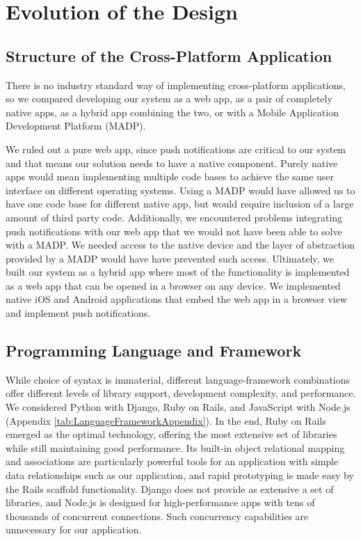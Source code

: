 \documentclass[12pt,letterpaper,titlepage]{article}
\begin{document}
\section{Evolution of the Design} \label{sec:EvolutionoftheDesign}

\subsection{Structure of the Cross-Platform Application} \label{sec:StructureoftheCrossPlatformApplication}

There is no industry standard way of implementing cross-platform applications, so we compared developing our system as a web app, as a pair of completely native apps, as a hybrid app combining the two, or with a Mobile Application Development Platform (MADP).

We ruled out a pure web app, since push notifications are critical to our system and that means our solution needs to have a native component. Purely native apps would mean implementing multiple code bases to achieve the same user interface on different operating systems. Using a MADP would have allowed us to have one code base for different native app, but would require inclusion of a large amount of third party code. Additionally, we encountered problems integrating push notifications with our web app that we would not have been able to solve with a MADP. We needed access to the native device and the layer of abstraction provided by a MADP would have have prevented such access. Ultimately, we built our system as a hybrid app where most of the functionality is implemented as a web app that can be opened in a browser on any device. We implemented native iOS and Android applications that embed the web app in a browser view and implement push notifications.

\subsection{Programming Language and Framework} \label{sec:ProgrammingLanguageandFramework}

While choice of syntax is immaterial, different language-framework combinations offer different levels of library support, development complexity, and performance. We considered Python with Django, Ruby on Rails, and JavaScript with Node.js (Appendix \ref{tab:LanguageFrameworkAppendix}). In the end, Ruby on Rails emerged as the optimal technology, offering the most extensive set of libraries while still maintaining good performance. Its built-in object relational mapping and associations are particularly powerful tools for an application with simple data relationships such as our application, and rapid prototyping is made easy by the Rails scaffold functionality. Django does not provide as extensive a set of libraries, and Node.js is designed for high-performance apps with tens of thousands of concurrent connections. Such concurrency capabilities are unnecessary for our application.
\end{document}
